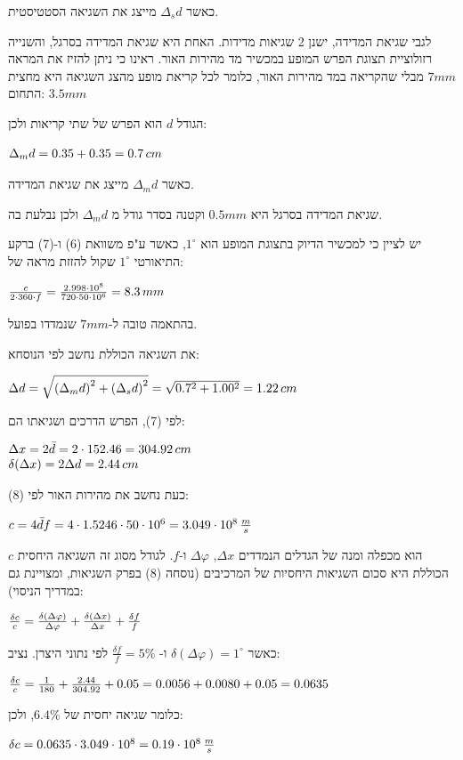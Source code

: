 \documentclass[14pt]{extarticle}
\makeatletter
\newenvironment{lefteqs}{%
    \begin{english}%
    \begin{flushleft}%
    \renewcommand{\arraystretch}{1.3}%
    $\begin{array}{@{}l@{}}%
}{%
    \end{array}$%
    \end{flushleft}%
    \end{english}%
}
\makeatother
\begin{document}
כאשר $\Delta_s d$ מייצג את השגיאה הסטטיסטית.

לגבי שגיאת המדידה, ישנן 2 שגיאות מדידות.
האחת היא שגיאת המדידה בסרגל, והשנייה רזולוציית תצוגת הפרש המופע במכשיר מד מהירות האור.
ראינו כי ניתן להזיז את המראה $7mm$ מבלי שהקריאה במד מהירות האור, כלומר לכל קריאת מופע מהצג
השגיאה היא מחצית התחום: $3.5mm$

הגודל $d$ הוא הפרש של שתי קריאות ולכן:

\begin{lefteqs}
    \Delta_m d = 0.35 + 0.35 = 0.7\,cm
\end{lefteqs}

כאשר $\Delta_m d$ מייצג את שגיאת המדידה.

שגיאת המדידה בסרגל היא $0.5mm$ וקטנה בסדר גודל מ $\Delta_m d$ ולכן נבלעת בה.

יש לציין כי למכשיר הדיוק בתצוגת המופע הוא $1^{\circ}$, כאשר ע"פ משוואת (6) ו-(7) ברקע התיאורטי
$1^\circ$ שקול להזזת מראה של:
\begin{lefteqs}
    \frac{c}{2 \cdot 360 \cdot f} = \frac{2.998 \cdot 10^8}{720 \cdot 50 \cdot 10^6} = 8.3\,mm
\end{lefteqs}
בהתאמה טובה ל-$7mm$ שנמדדו בפועל.

את השגיאה הכוללת נחשב לפי הנוסחא:
\begin{lefteqs}
    \Delta d = \sqrt{\left(\Delta_m d\right)^2 + \left(\Delta_s d\right)^2} = \sqrt{0.7^2 + 1.00^2} = 1.22\,cm
\end{lefteqs}

לפי (7), הפרש הדרכים ושגיאתו הם:
\begin{lefteqs}
    \Delta x = 2\bar{d} = 2 \cdot 152.46 = 304.92\,cm \\
    \delta(\Delta x) = 2 \Delta d = 2.44\,cm
\end{lefteqs}

כעת נחשב את מהירות האור לפי (8):
\begin{lefteqs}
    c = 4 \bar{d} f = 4 \cdot 1.5246 \cdot 50 \cdot 10^6 = 3.049 \cdot 10^8\,\frac{m}{s}
\end{lefteqs}

$c$ הוא מכפלה ומנה של הגדלים הנמדדים $\Delta x$, $\Delta \varphi$ ו-$f$.
לגודל מסוג זה השגיאה היחסית הכוללת היא סכום השגיאות היחסיות של המרכיבים (נוסחה (8) בפרק השגיאות, ומצויינת גם במדריך הניסוי):
\begin{lefteqs}
    \frac{\delta c}{c} = \frac{\delta(\Delta \varphi)}{\Delta \varphi} + \frac{\delta(\Delta x)}{\Delta x} + \frac{\delta f}{f}
\end{lefteqs}
כאשר $\delta(\Delta \varphi) = 1^\circ$ ו- $\frac{\delta f}{f} = 5\%$ לפי נתוני היצרן.
נציב:
\begin{lefteqs}
    \frac{\delta c}{c} = \frac{1}{180} + \frac{2.44}{304.92} + 0.05 = 0.0056 + 0.0080 + 0.05 = 0.0635
\end{lefteqs}
כלומר שגיאה יחסית של $6.4\%$, ולכן:
\begin{lefteqs}
    \delta c = 0.0635 \cdot 3.049 \cdot 10^8 = 0.19 \cdot 10^8\,\frac{m}{s}
\end{lefteqs}
\end{document}
